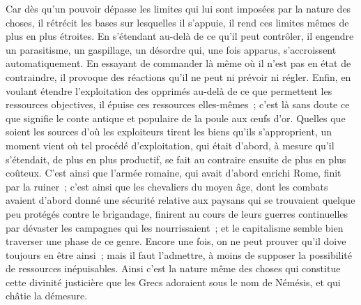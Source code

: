 \documentclass[french,twoside]{book} %
\begin{document}
Car dès qu'un pouvoir dépasse les limites qui lui sont imposées par la nature des choses, il rétrécit les bases sur lesquelles il s'appuie, il rend ces limites mêmes de plus en plus étroites. En s'étendant au-delà de ce qu'il peut contrôler, il engendre un parasitisme, un gaspillage, un désordre qui, une fois apparus, s'accroissent automatiquement. En essayant de commander là même où il n'est pas en état de contraindre, il provoque des réactions qu'il ne peut ni prévoir ni régler. Enfin, en voulant étendre l'exploitation des opprimés au-delà de ce que permettent les ressources objectives, il épuise ces ressources elles-mêmes ; c'est là sans doute ce que signifie le conte antique et populaire de la poule aux œufs d'or. Quelles que soient les sources d'où les exploiteurs tirent les biens qu'ils s'approprient, un moment vient où tel procédé d'exploitation, qui était d'abord, à mesure qu'il s'étendait, de plus en plus productif, se fait au contraire ensuite de plus en plus coûteux. C'est ainsi que l'armée romaine, qui avait d'abord enrichi Rome, finit par la ruiner ; c'est ainsi que les chevaliers du moyen âge, dont les combats avaient d'abord donné une sécurité relative aux paysans qui se trouvaient quelque peu protégés contre le brigandage, finirent au cours de leurs guerres continuelles par dévaster les campagnes qui les nourrissaient ; et le capitalisme semble bien traverser une phase de ce genre. Encore une fois, on ne peut prouver qu'il doive toujours en être ainsi ; mais il faut l'admettre, à moins de supposer la possibilité de ressources inépuisables. Ainsi c'est la nature même des choses qui constitue cette divinité justicière que les Grecs adoraient sous le nom de Némésis, et qui châtie la démesure.\par
\end{document}
